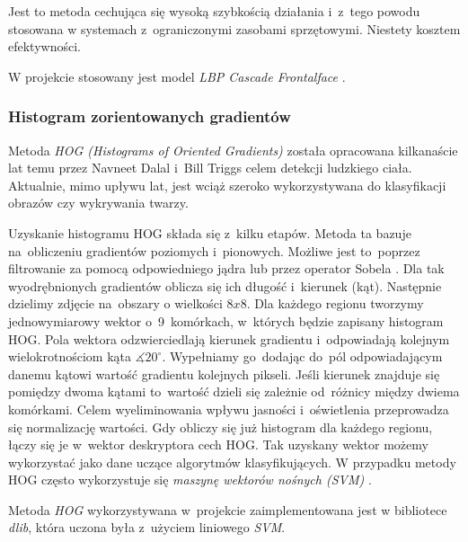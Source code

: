 \par

Jest to metoda cechująca się wysoką szybkością działania i~z~tego powodu stosowana w systemach z~ograniczonymi zasobami sprzętowymi. Niestety kosztem efektywności.

\par

W projekcie stosowany jest model \textit{LBP Cascade Frontalface} \cite{lbp_xml}.


\subsubsection{Histogram zorientowanych gradientów}
Metoda \textit{HOG (Histograms of Oriented Gradients)} \cite{hog_article} została opracowana kilkanaście lat temu przez Navneet Dalal i~Bill Triggs celem detekcji ludzkiego ciała. Aktualnie, mimo upływu lat, jest wciąż szeroko wykorzystywana do klasyfikacji obrazów czy wykrywania twarzy.

\par

Uzyskanie histogramu HOG składa się z~kilku etapów. Metoda \cite{hog_wprowadzenie} \cite{learnopencv_HOG} \cite{guide_hog} ta bazuje na~obliczeniu gradientów poziomych i~pionowych. Możliwe jest to~poprzez filtrowanie za pomocą odpowiedniego jądra lub przez operator Sobela \cite{feature_extraction}. Dla tak wyodrębnionych gradientów oblicza się ich długość i~kierunek (kąt). Następnie dzielimy zdjęcie na~obszary o wielkości $8x8$. Dla każdego regionu tworzymy jednowymiarowy wektor o~9~komórkach, w~których będzie zapisany histogram HOG. Pola wektora odzwierciedlają kierunek gradientu i~odpowiadają kolejnym wielokrotnościom kąta $\measuredangle 20 ^{\circ}$. Wypełniamy go~dodając do~pól odpowiadającym danemu kątowi wartość gradientu kolejnych pikseli. Jeśli kierunek znajduje się pomiędzy dwoma kątami to~wartość dzieli się zależnie od~różnicy między dwiema komórkami. Celem wyeliminowania wpływu jasności i~oświetlenia przeprowadza się normalizację wartości. Gdy obliczy się już histogram dla każdego regionu, łączy się je w~wektor deskryptora cech HOG. Tak uzyskany wektor możemy wykorzystać jako dane uczące algorytmów klasyfikujących. W przypadku metody HOG często wykorzystuje się \textit{maszynę wektorów nośnych (SVM)} \cite{svm_toward_science}.

\vspace{5mm}

Metoda \textit{HOG} wykorzystywana w~projekcie zaimplementowana jest w bibliotece \textit{dlib}, która uczona była z~użyciem liniowego \textit{SVM}.



